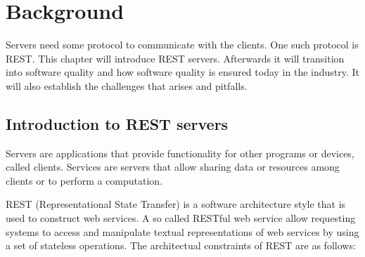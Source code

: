 \chapter{Background}\label{background}

Servers need some protocol to communicate with the clients. One such protocol
is REST. This chapter will introduce REST servers. Afterwards it will
transition into software quality and how software quality is ensured today in
the industry. It will also establish the challenges that arises and pitfalls.

\section{Introduction to REST servers}

Servers are applications that provide functionality for other programs or
devices, called clients. Services are servers that allow sharing data or
resources among clients or to perform a computation.

REST (Representational State Transfer) is a software architecture style that is
used to construct web services. A so called RESTful web service allow requesting
systems to access and manipulate textual representations of web services by
using a set of stateless operations. The architectual constraints of REST are as
follows:

